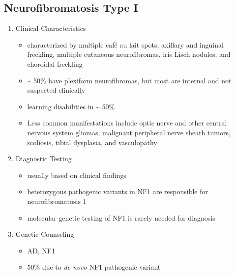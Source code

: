 \documentclass[12pt]{scrartcl}
\begin{document}
\subsection{Neurofibromatosis Type I}
\label{sec:org6dfef04}
\begin{enumerate}
\item Clinical Characteristics
\label{sec:org33db178}
\begin{itemize}
\item characterized by multiple café au lait spots, axillary and inguinal freckling, multiple cutaneous neurofibromas, iris Lisch nodules, and choroidal freckling
\item \textasciitilde{} 50\% have plexiform neurofibromas, but most are internal and not suspected clinically
\item learning disabilities in \textasciitilde{} 50\%
\item Less common manifestations include optic nerve and other central
nervous system gliomas, malignant peripheral nerve sheath tumors,
scoliosis, tibial dysplasia, and vasculopathy
\end{itemize}
\item Diagnostic Testing
\label{sec:org623bb0d}
\begin{itemize}
\item usually based on clinical findings
\item heterozygous pathogenic variants in NF1 are responsible for neurofibromatosis 1
\item molecular genetic testing of NF1 is rarely needed for diagnosis
\end{itemize}
\item Genetic Counseling
\label{sec:org0475197}
\begin{itemize}
\item AD, NF1
\item 50\% due to \emph{de novo} NF1 pathogenic variant
\end{itemize}
\end{enumerate}
\end{document}
